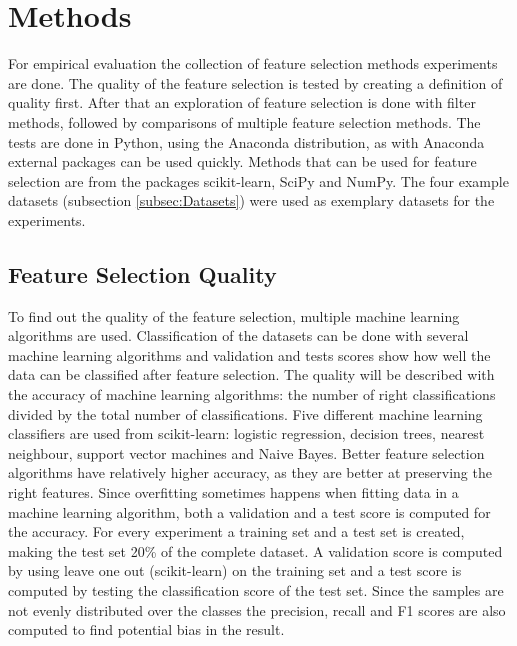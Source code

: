 	\newpage
	\section{Methods}
	\label{sec:Methods}

	For empirical evaluation the collection of feature selection methods experiments are done. The quality of the feature selection is tested by creating a definition of quality first. After that an exploration of feature selection is done with filter methods, followed by comparisons of multiple feature selection methods. The tests are done in Python, using the Anaconda distribution, as with Anaconda external packages can be used quickly. Methods that can be used for feature selection are from the packages scikit-learn\cite{pedregosa2011scikit}, SciPy\cite{jones2014scipy} and NumPy\cite{walt2011numpy}. The four example datasets (subsection \ref{subsec:Datasets}) were used as exemplary datasets for the experiments.
	
	\subsection{Feature Selection Quality}
	\label{subsec:DimensionalityReductionQuality}
	
	To find out the quality of the feature selection, multiple machine learning algorithms are used\cite{hall1998practical}.  Classification of the datasets can be done with several machine learning algorithms and validation and tests scores show how well the data can be classified after feature selection. The quality will be described with the accuracy of machine learning algorithms: the number of right classifications divided by the total number of classifications. Five different machine learning classifiers are used from scikit-learn: logistic regression, decision trees, nearest neighbour, support vector machines and Naive Bayes. Better feature selection algorithms have relatively higher accuracy, as they are better at preserving the right features. Since overfitting sometimes happens when fitting data in a machine learning algorithm, both a validation and a test score is computed for the accuracy. For every experiment a training set and a test set is created, making the test set 20\% of the complete dataset. A validation score is computed by using leave one out (scikit-learn) on the training set and a test score is computed by testing the classification score of the test set. Since the samples are not evenly distributed over the classes the precision, recall and F1 scores are also computed to find potential bias in the result.

